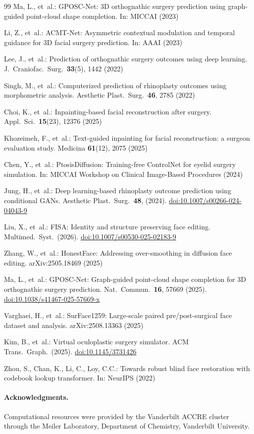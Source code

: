 \documentclass[runningheads]{llncs}
\begin{document}
\begin{thebibliography}{99}
Ma, L., et~al.:
GPOSC-Net: 3D orthognathic surgery prediction using graph-guided
point-cloud shape completion.
In: MICCAI (2023)

Li, Z., et~al.:
ACMT-Net: Asymmetric contextual modulation and temporal guidance for
3D facial surgery prediction.
In: AAAI (2023)

Lee, J., et~al.:
Prediction of orthognathic surgery outcomes using deep learning.
J.\ Craniofac.\ Surg.\ \textbf{33}(5), 1442 (2022)

Singh, M., et~al.:
Computerized prediction of rhinoplasty outcomes using morphometric analysis.
Aesthetic Plast.\ Surg.\ \textbf{46}, 2785 (2022)

Choi, K., et~al.:
Inpainting-based facial reconstruction after surgery.
Appl.\ Sci.\ \textbf{15}(23), 12376 (2025)

Khozeimeh, F., et~al.:
Text-guided inpainting for facial reconstruction: a surgeon evaluation study.
Medicina \textbf{61}(12), 2075 (2025)

Chen, Y., et~al.:
PtosisDiffusion: Training-free ControlNet for eyelid surgery simulation.
In: MICCAI Workshop on Clinical Image-Based Procedures (2024)

Jung, H., et~al.:
Deep learning-based rhinoplasty outcome prediction using conditional GANs.
Aesthetic Plast.\ Surg.\ \textbf{48}, (2024).
\href{https://doi.org/10.1007/s00266-024-04043-9}{doi:10.1007/s00266-024-04043-9}

Liu, X., et~al.:
FISA: Identity and structure preserving face editing.
Multimed.\ Syst.\ (2026).
\href{https://doi.org/10.1007/s00530-025-02183-9}{doi:10.1007/s00530-025-02183-9}

Zhang, W., et~al.:
HonestFace: Addressing over-smoothing in diffusion face editing.
arXiv:2505.18469 (2025)

Ma, L., et~al.:
GPOSC-Net: Graph-guided point-cloud shape completion for 3D orthognathic
surgery prediction.
Nat.\ Commun.\ \textbf{16}, 57669 (2025).
\href{https://doi.org/10.1038/s41467-025-57669-x}{doi:10.1038/s41467-025-57669-x}

Varghaei, H., et~al.:
SurFace1259: Large-scale paired pre/post-surgical face dataset and
analysis.
arXiv:2508.13363 (2025)

Kim, B., et~al.:
Virtual oculoplastic surgery simulator.
ACM Trans.\ Graph.\ (2025).
\href{https://doi.org/10.1145/3731426}{doi:10.1145/3731426}

Zhou, S., Chan, K., Li, C., Loy, C.C.:
Towards robust blind face restoration with codebook lookup transformer.
In: NeurIPS (2022)

\end{thebibliography}

\paragraph{Acknowledgments.}
Computational resources were provided by the Vanderbilt ACCRE cluster
through the Meiler Laboratory, Department of Chemistry, Vanderbilt
University.
\end{document}
